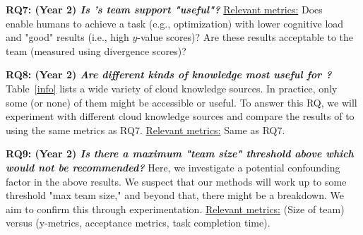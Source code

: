 
{\bf RQ7: (Year 2) \emph{Is {\IT}'s team support "useful"?}}
\underline{Relevant metrics:} Does \IT~ enable humans to achieve a task (e.g., optimization) with lower cognitive load and "good" results (i.e., high $y$-value scores)? Are these results acceptable to the team (measured using divergence scores)?

{\bf RQ8: (Year 2) \emph{Are different kinds of knowledge most useful for \IT?}}
Table~\ref{info} lists a wide variety of cloud knowledge sources. In practice, only some (or none) of them might be accessible or useful. To answer this RQ, we will experiment with different cloud knowledge sources and compare the results of  to  using the same metrics as RQ7.
\underline{Relevant metrics:} Same as RQ7.

{\bf RQ9: (Year 2) \emph{Is there a maximum "team size" threshold above which {\IT} would \textit{not} be recommended?}}
Here, we investigate a potential confounding factor in the above results. We suspect that our methods will work up to some threshold "max team size," and beyond that, there might be a breakdown. We aim to confirm this through experimentation.
\underline{Relevant metrics:} (Size of team) versus (y-metrics, acceptance metrics, task completion time).




 


